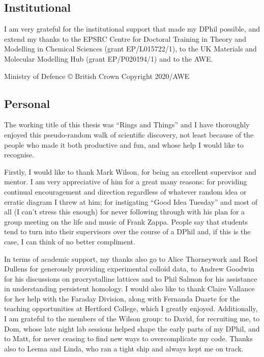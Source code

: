 \subsection*{Institutional}

I am very grateful for the institutional support that made my DPhil possible, and extend my thanks to the EPSRC Centre for Doctoral Training in Theory and Modelling in Chemical Sciences (grant EP/L015722/1), to the UK Materials and Molecular Modelling Hub (grant EP/P020194/1) and to the AWE.

\vspace{\baselineskip}

\noindent Ministry of Defence \copyright{} British Crown Copyright 2020/AWE

\subsection*{Personal}

The working title of this thesis was ``Rings and Things'' and I have thoroughly enjoyed this pseudo\--random walk of scientific discovery, not least because of the people who made it both productive and fun, and whose help I would like to recognise. 

Firstly, I would like to thank Mark Wilson, for being an excellent supervisor and mentor.
I am very appreciative of him for a great many reasons: for providing continual encouragement and direction regardless of whatever random idea or erratic diagram I threw at him; for instigating ``Good Idea Tuesday'' and most of all (I can't stress this enough) for never following through with his plan for a group meeting on the life and music of Frank Zappa.
People say that students tend to turn into their supervisors over the course of a DPhil and, if this is the case, I can think of no better compliment.

In terms of academic support, my thanks also go to Alice Thorneywork and Roel Dullens for generously providing experimental colloid data, to Andrew Goodwin for his discussions on procrystalline lattices and to Phil Salmon for his assistance in understanding persistent homology.
I would also like to thank Claire Vallance for her help with the Faraday Division, along with Fernanda Duarte for the teaching opportunities at Hertford College, which I greatly enjoyed.
Additionally, I am grateful to the members of the Wilson group: to David, for recruiting me, to Dom, whose late night lab sessions helped shape the early parts of my DPhil, and to Matt, for never ceasing to find new ways to overcomplicate my code.  
Thanks also to Leema and Linda, who ran a tight ship and always kept me on track.

